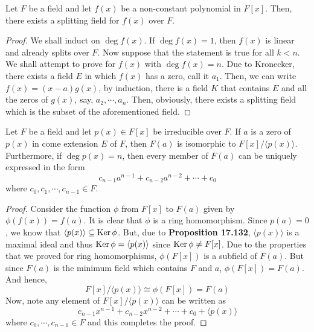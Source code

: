 \begin{proposition}
	Let $F$ be a field and let $f(x)$ be a non-constant polynomial in $F[x]$. Then, there exists a splitting field for $f(x)$ over $F$.
\end{proposition}
\begin{proof}
	We shall induct on $\deg f(x)$. If $\deg f(x)=1$, then $f(x)$ is linear and already splits over $F$. Now suppose that the statement is true for all $k<n$. We shall attempt to prove for $f(x)$ with $\deg f(x)=n$. Due to Kronecker, there exists a field $E$ in which $f(x)$ has a zero, call it $a_1$. Then, we can write $f(x)=(x-a)g(x)$, by induction, there is a field $K$ that contains $E$ and all the zeros of $g(x)$, say, $a_2,\cdots,a_n$. Then, obviously, there exists a splitting field which is the subset of the aforementioned field.
\end{proof}

\begin{proposition}
	Let $F$ be a field and let $p(x)\in F[x]$ be irreducible over $F$. If $a$ is a zero of $p(x)$ in come extension $E$ of $F$, then $F(a)$ is isomorphic to $F[x]/\langle p(x)\rangle$. Furthermore, if $\deg p(x)=n$, then every member of $F(a)$ can be uniquely expressed in the form
	\begin{equation*}
		c_{n-1}a^{n-1}+c_{n-2}a^{n-2}+\cdots+c_0
	\end{equation*}
	where $c_0,c_1,\cdots,c_{n-1}\in F$.
\end{proposition}
\begin{proof}
	Consider the function $\phi$ from $F[x]$ to $F(a)$ given by $\phi(f(x))=f(a)$. It is clear that $\phi$ is a ring homomorphism. Since $p(a)=0$, we know that $\langle p(x)\rangle\subseteq\operatorname{Ker}\phi$. But, due to \textbf{Proposition 17.132}, $\langle p(x)\rangle$ is a maximal ideal and thus $\operatorname{Ker}\phi = \langle p(x)\rangle$ since $\operatorname{Ker}\phi\ne F[x]$. Due to the properties that we proved for ring homomorphisms, $\phi(F[x])$ is a subfield of $F(a)$. But since $F(a)$ is the minimum field which contains $F$ and $a$, $\phi(F[x])=F(a)$. And hence,
	\begin{equation*}
		F[x]/\langle p(x)\rangle\cong\phi(F[x])=F(a)
	\end{equation*}
	Now, note any element of $F[x]/\langle p(x)\rangle$ can be written as 
	\begin{equation*}
		c_{n-1}x^{n-1}+c_{n-2}x^{n-2}+\cdots+c_0 + \langle p(x)\rangle 
	\end{equation*}
	where $c_0,\cdots,c_{n-1}\in F$ and this completes the proof.
\end{proof}


